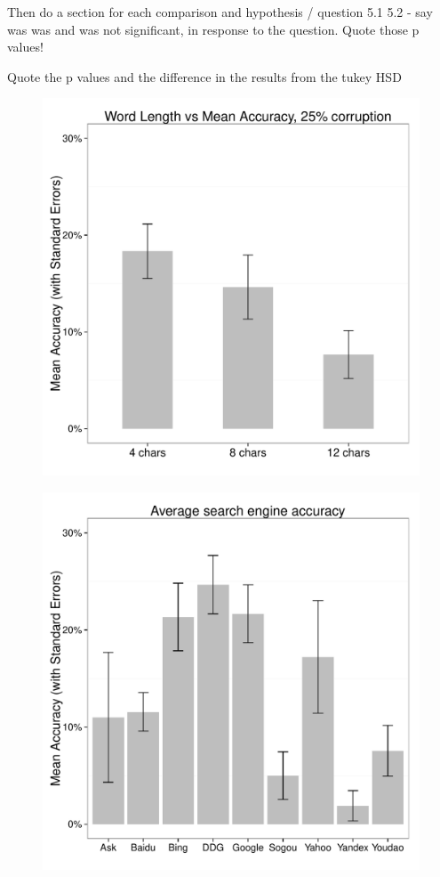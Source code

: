 \documentclass{csfourzero}
\begin{document}
Then do a section for each comparison and hypothesis / question 5.1 5.2 - say was was and was not significant, in response to the question. Quote those p values!

Quote the p values and the difference in the results from the tukey HSD

\begin{figure}
  \centering
  \begin{minipage}{.5\textwidth}
    \centering
    \includegraphics[width=\textwidth]{len_vs_acc}
    \label{fig:lengths}
  \end{minipage}%
  \begin{minipage}{.5\textwidth}
    \centering
    \includegraphics[width=\textwidth]{eng_vs_acc}

\end{minipage}
\end{figure}
\end{document}
